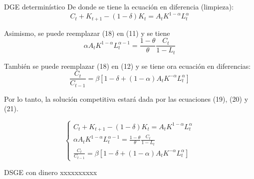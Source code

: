 \documentclass[letterpaper, 11pt]{extarticle}
\begin{document}
\begin{problem}{DGE determinístico}{}
De donde se tiene la ecuación en diferencia (limpieza):
\begin{equation}
    C_t+K_{t+1}-(1-\delta)K_t=A_tK^{1-\alpha}L_t^{\alpha}
\end{equation}

Asimismo, se puede reemplazar (18) en (11) y se tiene
\begin{equation}
    \alpha A_tK^{1-\alpha}L_t^{\alpha-1}=\dfrac{1-\theta}{\theta}\dfrac{C_t}{1-L_t}
\end{equation}

También se puede reemplazar (18) en (12) y se tiene ora ecuación en diferencias:
\begin{equation}
    \dfrac{C_t}{C_{t-1}}=\beta[1-\delta+(1-\alpha)A_tK^{-\alpha}L_t^{\alpha}]
\end{equation}


Por lo tanto, la solución competitiva estará dada por las ecuaciones (19), (20) y (21).

\begin{equation}
\left\{
\begin{array}{l}
    C_t + K_{t+1} - (1-\delta)K_t = A_t K^{1-\alpha} L_t^{\alpha} \\
    \alpha A_t K^{1-\alpha} L_t^{\alpha-1} = \frac{1-\theta}{\theta} \frac{C_t}{1-L_t} \\
    \frac{C_t}{C_{t-1}} = \beta \left[1 - \delta + (1 - \alpha) A_t K^{-\alpha} L_t^{\alpha} \right]
\end{array}
\right.
\end{equation}


\end{problem}





\begin{problem}{DSGE con dinero}{}
xxxxxxxxxx
\end{problem}
\end{document}
